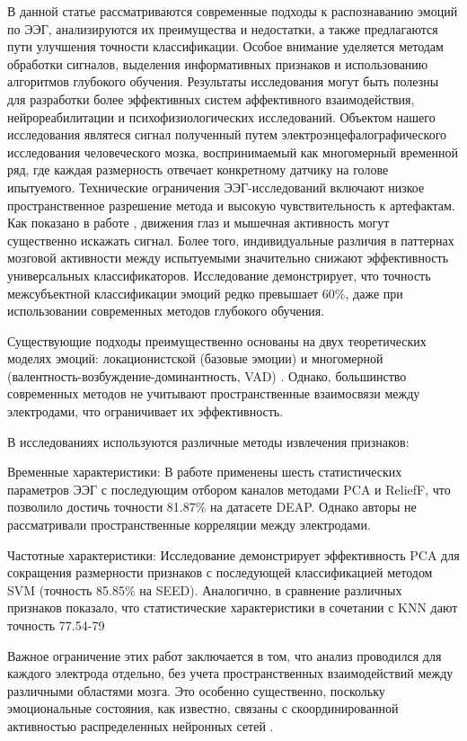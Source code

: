 \documentclass[12pt, twoside]{article}
\begin{document}
В данной статье рассматриваются современные подходы к распознаванию эмоций по ЭЭГ, анализируются их преимущества и недостатки, а также предлагаются пути улучшения точности классификации. Особое внимание уделяется методам обработки сигналов, выделения информативных признаков и использованию алгоритмов глубокого обучения. Результаты исследования могут быть полезны для разработки более эффективных систем аффективного взаимодействия, нейрореабилитации и психофизиологических исследований. Объектом нашего исследования являтеся сигнал полученный путем электроэнцефалографического исследования человеческого мозка, воспринимаемый как многомерный временной ряд, где каждая размерность отвечает конкретному датчику на голове ипытуемого. Технические ограничения ЭЭГ-исследований включают низкое пространственное разрешение метода и высокую чувствительность к артефактам. Как показано в работе \cite{1}, движения глаз и мышечная активность могут существенно искажать сигнал. Более того, индивидуальные различия в паттернах мозговой активности между испытуемыми значительно снижают эффективность универсальных классификаторов. Исследование \cite{2} демонстрирует, что точность межсубъектной классификации эмоций редко превышает 60\%, даже при использовании современных методов глубокого обучения.

Существующие подходы преимущественно основаны на двух теоретических моделях эмоций: локационистской (базовые эмоции) и многомерной (валентность-возбуждение-доминантность, VAD) \cite{3}. Однако, большинство современных методов не учитывают пространственные взаимосвязи между электродами, что ограничивает их эффективность.


В исследованиях используются различные методы извлечения признаков:

Временные характеристики: В работе \cite{4} применены шесть статистических параметров ЭЭГ с последующим отбором каналов методами PCA и ReliefF, что позволило достичь точности 81.87\% на датасете DEAP. Однако авторы не рассматривали пространственные корреляции между электродами.\par

Частотные характеристики: Исследование \cite{5} демонстрирует эффективность PCA для сокращения размерности признаков с последующей классификацией методом SVM (точность 85.85\% на SEED). Аналогично, в \cite{6} сравнение различных признаков показало, что статистические характеристики в сочетании с KNN дают точность 77.54-79%

Важное ограничение этих работ заключается в том, что анализ проводился для каждого электрода отдельно, без учета пространственных взаимодействий между различными областями мозга. Это особенно существенно, поскольку эмоциональные состояния, как известно, связаны с скоординированной активностью распределенных нейронных сетей \cite{7}.
\end{document}
